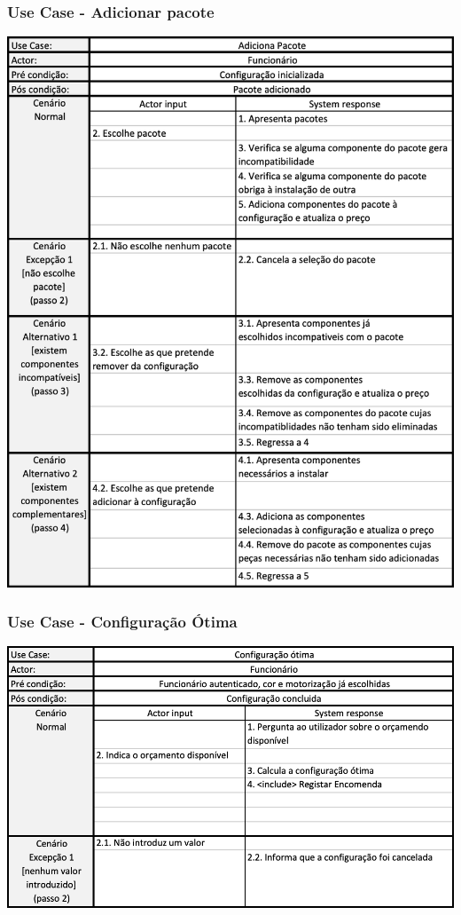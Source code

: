 \subsubsection{Use Case - Adicionar pacote}
\begin{center}
 	\includegraphics[width = 5.5in]{D_E_USECASE/uc_adicionar_pacote.png}
\end{center}
\subsubsection{Use Case - Configuração Ótima}
\begin{center}
 	\includegraphics[width = 5.5in]{D_E_USECASE/uc_configuracao_otima.png}
\end{center}

